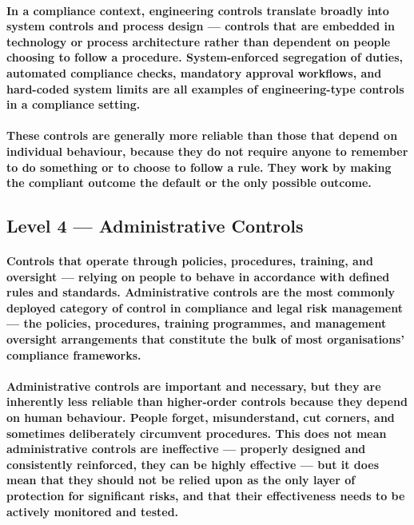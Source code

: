 \paragraph{In a compliance context, engineering controls translate broadly into \textbf{system controls and process design} — controls that are embedded in technology or process architecture rather than dependent on people choosing to follow a procedure. System-enforced segregation of duties, automated compliance checks, mandatory approval workflows, and hard-coded system limits are all examples of engineering-type controls in a compliance setting.}
\paragraph{These controls are generally more reliable than those that depend on individual behaviour, because they do not require anyone to remember to do something or to choose to follow a rule. They work by making the compliant outcome the default or the only possible outcome.}

\subsection{Level 4 — Administrative Controls}
\paragraph{Controls that operate through policies, procedures, training, and oversight — relying on people to behave in accordance with defined rules and standards. Administrative controls are the most commonly deployed category of control in compliance and legal risk management — the policies, procedures, training programmes, and management oversight arrangements that constitute the bulk of most organisations' compliance frameworks.}
\paragraph{Administrative controls are important and necessary, but they are inherently less reliable than higher-order controls because they depend on human behaviour. People forget, misunderstand, cut corners, and sometimes deliberately circumvent procedures. This does not mean administrative controls are ineffective — properly designed and consistently reinforced, they can be highly effective — but it does mean that they should not be relied upon as the only layer of protection for significant risks, and that their effectiveness needs to be actively monitored and tested.}

